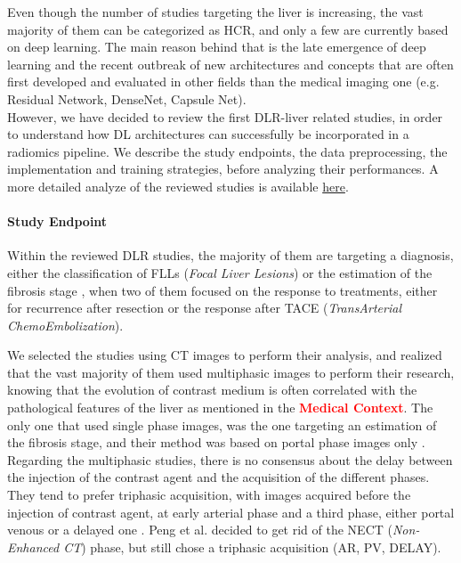 \documentclass[]{article}
\let\oldparagraph\paragraph
\renewcommand{\paragraph}[1]{\oldparagraph{#1}\mbox{}}
\begin{document}
Even though the number of studies targeting the liver is increasing, the
vast majority of them can be categorized as HCR, and only a few
are currently based on deep learning.
The main reason behind that is the late emergence of deep learning and
the recent outbreak of new architectures and concepts that are often
first developed and evaluated in other fields than the medical imaging
one (e.g. Residual Network, DenseNet, Capsule Net).\\
However, we have decided to review the first DLR-liver related studies, in order to understand how DL architectures can successfully be incorporated in a radiomics pipeline. We describe the study endpoints, the data preprocessing, the implementation and training strategies, before analyzing their performances. A more detailed analyze of the reviewed studies is available \href{https://docs.google.com/spreadsheets/d/1VktRkGiX0J7RzQEVxRq1LxKPfV6YsrzHhctr0xlkEBY/edit#gid=0}{here}.

\paragraph{Study Endpoint}\label{study-endpoint}

Within the reviewed DLR studies, the majority of them are
targeting a diagnosis, either the classification of FLLs (\emph{Focal
Liver Lesions}) \cite{Yamada2019,Wang2018,Yasaka2018,Liang2018} or the estimation of the fibrosis
stage \cite{Yasaka2018a}, when two of them focused on the
response to treatments, either for recurrence after resection \cite{WANG2019} or the response after TACE (\emph{TransArterial ChemoEmbolization})\cite{Peng2020}.

We selected the studies using CT images to perform their
analysis, and realized that the vast majority of them used multiphasic
images to perform their research, knowing that the evolution of contrast
medium is often correlated with the pathological features of the liver
as mentioned in the \textcolor{red}{\textbf{Medical Context}}. The only one that used
single phase images, was the one targeting an estimation of the fibrosis
stage, and their method was based on portal phase images only \cite{Yasaka2018a}. Regarding the multiphasic studies,
there is no consensus about the delay between the injection of the
contrast agent and the acquisition of the different phases. They tend to
prefer triphasic acquisition, with images acquired before the injection
of contrast agent, at early arterial phase and a third phase, either
portal venous \cite{WANG2019,Wang2018,Liang2018} or a delayed one \cite{Yamada2019, Yasaka2018}. Peng et al. decided to get rid of the NECT
(\emph{Non-Enhanced CT}) phase, but still chose a triphasic acquisition
(AR, PV, DELAY).
\end{document}
